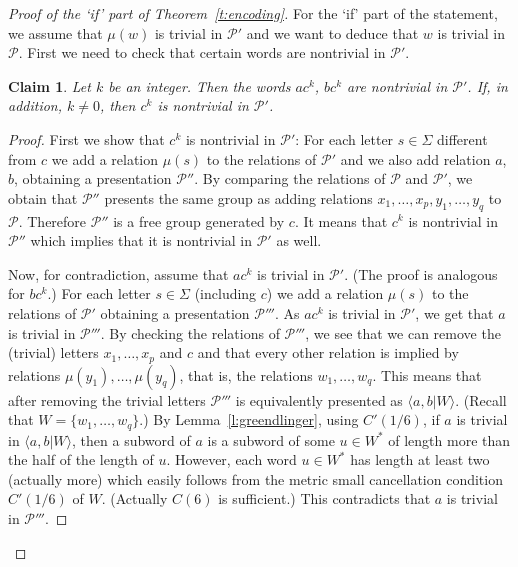 \documentclass[10pt,a4paper]{article}
\newtheorem{claim}{Claim}[theorem]
\theoremstyle{definition}
\theoremstyle{remark}
\newcommand\PP{\mathcal{P}}
\begin{document}
\begin{proof}[Proof of the `if' part of Theorem~\ref{t:encoding}]
  For the `if' part of the statement, we assume that $\mu(w)$ is trivial in
  $\PP'$ and we want to deduce that $w$ is trivial in $\PP$. First we need to
  check that certain words are nontrivial in $\PP'$. 
  
\begin{claim}
  \label{c:nontrivial}
  Let $k$ be an integer. Then the words
  $ac^{k}$, $bc^{k}$ are nontrivial in $\PP'$. If, in addition, $k \neq 0$, then $c^k$ is
  nontrivial 
  in $\PP'$.
\end{claim}
  
  \begin{proof}
    First we show that $c^k$ is nontrivial in $\PP'$: For each letter $s \in
    \Sigma$ different from $c$ we add a relation $\mu(s)$ to the relations of
    $\PP'$ and we also add relation $a$, $b$, obtaining a presentation $\PP''$.
    By comparing the relations of $\PP$ and $\PP'$, we obtain that $\PP''$
    presents the same group as adding relations $x_1, \dots, x_p, y_1, \dots,
    y_q$ to $\PP$. Therefore $\PP''$ is a free group generated by $c$. It means
    that $c^k$ is nontrivial in $\PP''$ which implies that it is nontrivial in
    $\PP'$ as well.

    Now, for contradiction, assume that $ac^k$ is trivial in $\PP'$. (The proof is analogous
    for $bc^k$.) For each letter $s \in \Sigma$ (including $c$) we add a
    relation $\mu(s)$ to the relations of $\PP'$ obtaining a presentation
    $\PP'''$. As $ac^k$ is trivial in $\PP'$, we get that $a$ is trivial in $\PP'''$.
    By checking the relations of $\PP'''$, we see that we can remove the
    (trivial) letters $x_1, \dots, x_p$ and $c$ and that every other relation
    is implied by relations $\mu(y_1), \dots, \mu(y_q)$, that is, the relations
    $w_1, \dots, w_q$. This means that
    after removing the trivial letters $\PP'''$ is
    equivalently presented as $\langle a, b| W\rangle$. (Recall that $W
    = \{w_1, \dots, w_q\}$.) By
    Lemma~\ref{l:greendlinger}, using $C'(1/6)$, if $a$ is trivial in $\langle a, b| W\rangle$, then a
    subword of $a$ is a subword of some $u \in W^*$ of length more than the
    half of the length of $u$. However, each word $u \in W^*$ has length at
    least two (actually more) which easily follows from the metric small
    cancellation condition $C'(1/6)$ of $W$. (Actually $C(6)$ is
    sufficient.) This contradicts that $a$ is trivial in
    $\PP'''$.
  \end{proof}




\end{proof}
\end{document}

